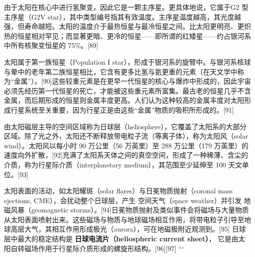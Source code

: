 由于太阳在核心中进行氢聚变，因此它是一颗主序星。更具体地说，它属于G2 型主序星（G2V star），其中类型编号指其有效温度。主序星温度越高，其光度越强，但寿命越短。太阳的温度介于最热恒星与最冷恒星之间。比太阳更明亮、更炽热的恒星相对罕见；而显著更暗、更冷的恒星——即所谓的红矮星——约占银河系中所有核聚变恒星的 75\%。[89]

太阳属于第一族恒星（Population I star），形成于银河系的旋臂中。与银河系核球与晕中的老年第二族恒星相比，它含有更多比氢与氦更重的元素（在天文学中称为“金属”）。[90]这些较重元素是在更早一代恒星的核心与爆炸中形成的，因此宇宙必须先经历第一代恒星的死亡，才能被这些重元素所富集。最古老的恒星几乎不含金属，而后期形成的恒星则金属丰度更高。人们认为这种较高的金属丰度对太阳形成行星系统至关重要，因为行星正是由这些“金属”物质的吸积所形成的。[91]

由太阳磁层主导的空间区域称为日球层（heliosphere），它覆盖了太阳系的大部分区域。除了光之外，太阳还不断释放带电粒子流（等离子体），称为太阳风（solar wind）。太阳风以每小时 90 万公里（56 万英里）至 288 万公里（179 万英里）的速度向外扩散，[92]充满了太阳系天体之间的真空空间，形成了一种稀薄、含尘的介质，称为行星际介质（interplanetary medium），其范围至少延伸至 100 天文单位。[93]

太阳表面的活动，如太阳耀斑（solar flares）与日冕物质抛射（coronal mass ejections, CME），会扰动整个日球层，产生 空间天气（space weather）并引发 地磁风暴（geomagnetic storms）。[94]日冕物质抛射及类似事件会将磁场与大量物质从太阳表面喷射出来。这些磁场与物质与地球磁场相互作用，将带电粒子引导至地球高层大气，其相互作用形成极光（aurora），可在地磁极附近观测到。[95]  
日球层中最大的稳定结构是 \textbf{日球电流片（heliospheric current sheet）}，  
它是由太阳自转磁场作用于行星际介质形成的螺旋形结构。[96][97]
```


